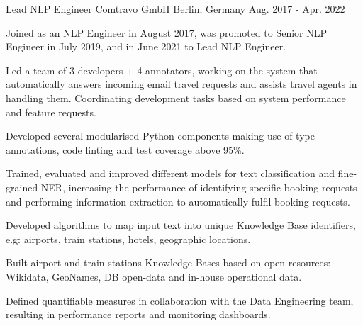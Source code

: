 \begin{cventries}
  \cventry
    {Lead NLP Engineer} %
    {Comtravo GmbH} %
    {Berlin, Germany} %
    {Aug. 2017 - Apr. 2022} %
	{
      \begin{cvitems} %
		\item {Joined as an NLP Engineer in August 2017, was promoted to Senior NLP Engineer in July 2019, and in June 2021 to Lead NLP Engineer.}
        \item {Led a team of 3 developers + 4 annotators, working on the system that automatically answers incoming email travel requests and assists travel agents in handling them. Coordinating development tasks based on system performance and feature requests.}
        \item {Developed several modularised Python components making use of type annotations, code linting and test coverage above 95\%.}
        \item {Trained, evaluated and improved different models for text classification and fine-grained NER, increasing the performance of identifying specific booking requests and performing information extraction to automatically fulfil booking requests.}
		\item {Developed algorithms to map input text into unique Knowledge Base identifiers, e.g: airports, train stations, hotels, geographic locations.}
		\item {Built airport and train stations Knowledge Bases based on open resources: Wikidata, GeoNames, DB open-data and in-house operational data.}
		\item {Defined quantifiable measures in collaboration with the Data Engineering team, resulting in performance reports and monitoring dashboards.}
      \end{cvitems}
    }

\begin{comment}
  \cventry
    {Senior NLP Engineer} %
    {Comtravo GmbH} %
    {} %
    {Aug. 2019 - May 2021} %
	{}

  \cventry
    {NLP Engineer} %
    {Comtravo GmbH} %
    {} %
    {Aug. 2017 - Jul. 2019} %
	{}
\end{comment}


\end{cventries}
